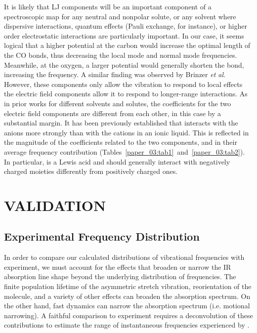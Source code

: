 \documentclass[%
  class = book,%
  crop = false,%
  float = true,%
  multi = true,%
  preview = false,%
]{standalone}
\let\cite\autocite
\newcommand{\caps}[1]{\uppercase{#1}}
\begin{document}
It is likely that LJ components will be an important component of a spectroscopic map for any neutral and nonpolar solute, or any solvent where dispersive interactions, quantum effects (Pauli exchange, for instance), or higher order electrostatic interactions are particularly important. In our case, it seems logical that a higher potential at the carbon would increase the optimal length of the CO bonds, thus decreasing the local mode and normal mode frequencies. Meanwhile, at the oxygen, a larger potential would generally shorten the bond, increasing the frequency. A similar finding was observed by Brinzer \emph{et al}.\cite{Brinzer2015} However, these components only allow the  vibration to respond to local effects \textemdash{} the electric field components allow it to respond to longer-range interactions. As in prior works for different solvents and solutes, the coefficients for the two electric field components are different from each other, in this case by a substantial margin. It has been previously established that  interacts with the anions more strongly than with the cations in an ionic liquid.\cite{Cadena2004,akiJPCB-04,anthonyJPCB-05,Muldoon2007a,houIECR-07,ramdinIECR-12} This is reflected in the magnitude of the coefficients related to the two components, and in their average frequency contribution (Tables~\ref{paper_03:tab1}~and~\ref{paper_03:tab2}). In particular,  is a Lewis acid and should generally interact with negatively charged moieties differently from positively charged ones.

\section{\texorpdfstring{\caps{Validation}}{Validation}}
\label{paper_03:sec:V}

\subsection{Experimental Frequency Distribution}
\label{paper_03:ssec:V-A}

In order to compare our calculated distributions of  vibrational frequencies with experiment, we must account for the effects that broaden or narrow the IR absorption line shape beyond the underlying distribution of frequencies. The finite population lifetime of the asymmetric stretch vibration, reorientation of the  molecule, and a variety of other effects can broaden the absorption spectrum. On the other hand, fast dynamics can narrow the absorption spectrum (i.e. motional narrowing). A faithful comparison to experiment requires a deconvolution of these contributions to estimate the range of instantaneous frequencies experienced by .
\end{document}
